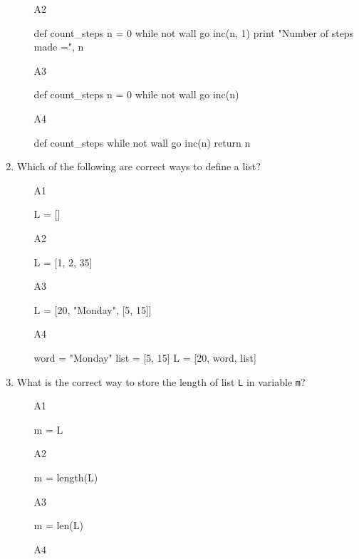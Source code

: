 \begin{enumerate}
\begin{enumerate}
\begin{bluecode}
\end{bluecode}
\item[A2] 
\begin{bluecode}
def count_steps
    n = 0
    while not wall
        go
        inc(n, 1)
    print "Number of steps made =", n
\end{bluecode}
\item[A3] 
\begin{bluecode}
def count_steps
    n = 0
    while not wall
        go
        inc(n)
\end{bluecode}
\item[A4] 
\begin{bluecode}
def count_steps
    while not wall
        go
        inc(n)
    return n
\end{bluecode}
\end{enumerate}
\item Which of the following are correct ways to define a list?
\begin{enumerate}
\item[A1] 
\begin{bluecode}
L = []
\end{bluecode}
\item[A2] 
\begin{bluecode}
L = [1, 2, 35]
\end{bluecode}
\item[A3] 
\begin{bluecode}
L = [20, "Monday", [5, 15]]
\end{bluecode}
\item[A4] 
\begin{bluecode}
word = "Monday"
list = [5, 15]
L = [20, word, list]
\end{bluecode}
\end{enumerate}
\item What is the correct way to store the length of list {\tt L}
in variable {\tt m}?
\begin{enumerate}
\item[A1] 
\begin{bluecode}
m = L
\end{bluecode}
\item[A2] 
\begin{bluecode}
m = length(L)
\end{bluecode}
\item[A3] 
\begin{bluecode}
m = len(L)
\end{bluecode}
\item[A4] 
\begin{bluecode}

\end{bluecode}
\end{enumerate}
\end{enumerate}
